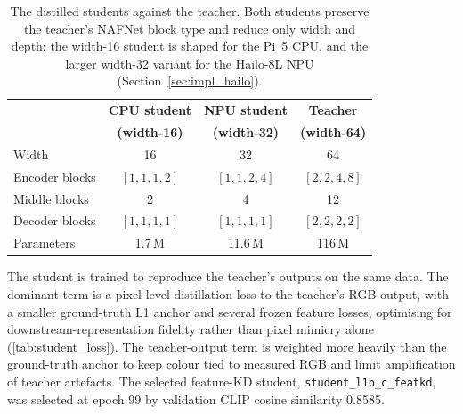 \begin{table}[!htbp]
\centering
\footnotesize
\begin{tabular}{lccc}
\hline
 & \textbf{CPU student} & \textbf{NPU student} & \textbf{Teacher} \\
 & \textbf{(width-16)} & \textbf{(width-32)} & \textbf{(width-64)} \\
\hline
Width          & 16          & 32          & 64          \\
Encoder blocks & $[1,1,1,2]$ & $[1,1,2,4]$ & $[2,2,4,8]$ \\
Middle blocks  & 2           & 4           & 12          \\
Decoder blocks & $[1,1,1,1]$ & $[1,1,1,1]$ & $[2,2,2,2]$ \\
Parameters     & 1.7\,M      & 11.6\,M     & 116\,M      \\
\hline
\end{tabular}
\caption{The distilled students against the teacher. Both students preserve the teacher's NAFNet block type and reduce only width and depth; the width-16 student is shaped for the Pi~5 CPU, and the larger width-32 variant for the Hailo-8L NPU (Section~\ref{sec:impl_hailo}).}
\label{tab:student_arch}
\end{table}

The student is trained to reproduce the teacher's outputs on the same data. The dominant term is a pixel-level distillation loss to the teacher's RGB output, with a smaller ground-truth L1 anchor and several frozen feature losses, optimising for downstream-representation fidelity rather than pixel mimicry alone (\autoref{tab:student_loss}). The teacher-output term is weighted more heavily than the ground-truth anchor to keep colour tied to measured RGB and limit amplification of teacher artefacts. The selected feature-KD student, \texttt{student\_l1b\_c\_featkd}, was selected at epoch 99 by validation CLIP cosine similarity 0.8585.
\pagebreak

